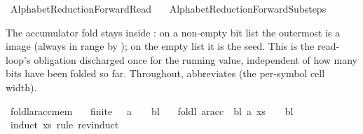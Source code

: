 %
\begin{isabellebody}%
%
%
\isadelimtheory
%
\endisadelimtheory
%
\isatagtheory
{}\isamarkupfalse%
\ AlphabetReduction{\isacharunderscore}{\kern0pt}ForwardRead\isanewline
\ \ \ AlphabetReduction{\isacharunderscore}{\kern0pt}ForwardSubsteps\isanewline
{}%
\endisatagtheory
{\isafoldtheory}%
%
\isadelimtheory
%
\endisadelimtheory
%
\isadelimdocument
%
\endisadelimdocument
%
\isatagdocument
%
\isamarkuptrue%
%
\endisatagdocument
{\isafolddocument}%
%
\isadelimdocument
%
\endisadelimdocument
%
\begin{isamarkuptext}%
The accumulator fold stays inside :
  on a non-empty bit list the outermost  is a
   image (always in range by );
  on the empty list it is the seed.  This is the read-loop's
   obligation discharged once for the running
   value, independent of how many bits have been folded so
  far.
  Throughout,  abbreviates  (the per-symbol cell width).%
\end{isamarkuptext}\isamarkuptrue%
\isamarkupfalse%
\ foldl{\isacharunderscore}{\kern0pt}ar{\isacharunderscore}{\kern0pt}acc{\isacharunderscore}{\kern0pt}mem{\isacharcolon}{\kern0pt}\isanewline
\ \ \ {\isachardoublequoteopen}finite\ {\isasymGamma}{\isachardoublequoteclose}\ \ {\isachardoublequoteopen}a\ {\isasymin}\ {\isasymGamma}\ {\isasymunion}\ {\isacharbraceleft}{\kern0pt}bl{\isacharbraceright}{\kern0pt}{\isachardoublequoteclose}\isanewline
\ \ \ {\isachardoublequoteopen}foldl\ {\isacharparenleft}{\kern0pt}ar{\isacharunderscore}{\kern0pt}acc\ {\isasymGamma}\ bl{\isacharparenright}{\kern0pt}\ a\ xs\ {\isasymin}\ {\isasymGamma}\ {\isasymunion}\ {\isacharbraceleft}{\kern0pt}bl{\isacharbraceright}{\kern0pt}{\isachardoublequoteclose}\isanewline
%
\isadelimproof
%
\endisadelimproof
%
\isatagproof
{}\isamarkupfalse%
\ {\isacharparenleft}{\kern0pt}induct\ xs\ rule{\isacharcolon}{\kern0pt}\ rev{\isacharunderscore}{\kern0pt}induct{\isacharparenright}{\kern0pt}\isanewline

\end{isabellebody}
